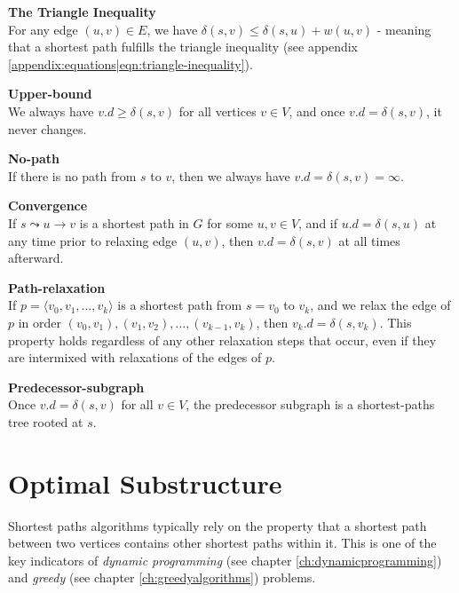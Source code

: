 \begin{description}
	\item \textbf{The Triangle Inequality} \cite[p.~671, thm. 24.10]{clrs} \\
For any edge $(u, v) \in E$, we have $\delta(s, v) \leq \delta(s, u) +
w(u, v)$ - meaning that a shortest path fulfills the triangle inequality (see
appendix \ref{appendix:equations|eqn:triangle-inequality}).

	\item \textbf{Upper-bound} \cite[p.~671-672, thm. 24.11]{clrs} \\
We always have $v.d \geq \delta(s, v)$ for all vertices $v \in V$, and once
$v.d = \delta(s, v)$, it never changes.

	\item \textbf{No-path} \cite[p.~672, thm. 24.12]{clrs} \\
If there is no path from $s$ to $v$, then we always have $v.d = \delta(s, v) =
\infty$.

	\item \textbf{Convergence} \cite[p.~672-673, thm. 24.14]{clrs} \\
If $s \leadsto u \rightarrow v$ is a shortest path in $G$ for some
$u, v \in V$, and if $u.d = \delta(s, u)$ at any time prior to relaxing edge
$(u, v)$, then $v.d = \delta(s,v)$ at all times afterward.
	\item \textbf{Path-relaxation} \cite[p.~673, thm. 24.15]{clrs} \\
If $p = \langle v_0, v_1, \dots, v_k \rangle$ is a shortest path from
$s = v_0$ to $v_k$, and we relax the edge of $p$ in order $(v_0, v_1),
(v_1, v_2), \dots, (v_{k-1}, v_k)$, then $v_k.d = \delta(s, v_k)$. This
property holds regardless of any other relaxation steps that occur, even if
they are intermixed with relaxations of the edges of $p$.
	\item \textbf{Predecessor-subgraph} \cite[p.~676, thm. 24.17]{clrs} \\
Once $v.d = \delta(s, v)$ for all $v \in V$, the predecessor subgraph is a
shortest-paths tree rooted at $s$.
\end{description}

\section{Optimal Substructure}
Shortest paths algorithms typically rely on the property that a shortest path
between two vertices contains other shortest paths within it. This is one of
the key indicators of \textit{dynamic programming} (see chapter
\ref{ch:dynamicprogramming}) and \textit{greedy} (see chapter
\ref{ch:greedyalgorithms}) problems.

